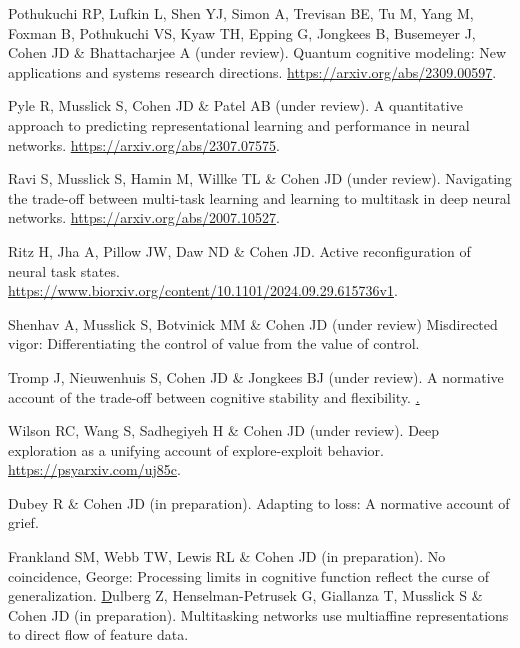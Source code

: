 \documentclass[10 pt]{article}
\begin{document}
Pothukuchi RP, Lufkin L, Shen YJ, Simon A, Trevisan BE, Tu M, Yang M, Foxman B, Pothukuchi VS, Kyaw TH, Epping G,
Jongkees B, Busemeyer J, Cohen JD \& Bhattacharjee A (under review). Quantum cognitive modeling: New applications and systems research directions. \href{https://arxiv.org/abs/2309.00597}{https://arxiv.org/abs/2309.00597}.

Pyle R, Musslick S, Cohen JD \& Patel AB (under review). A quantitative approach to predicting representational
learning and performance in neural networks. \href{https://arxiv.org/abs/2307.07575}{https://arxiv.org/abs/2307.07575}.

Ravi S, Musslick S, Hamin M, Willke TL \& Cohen JD (under review). Navigating the trade-off between multi-task
learning and learning to multitask in deep neural networks. \href{https://arxiv.org/abs/2007.10527}{https://arxiv.org/abs/2007.10527}.

Ritz H, Jha A, Pillow JW, Daw ND \& Cohen JD. Active reconfiguration of neural task states. \\ \href{
    https://www.biorxiv.org/content/10.1101/2024.09.29.615736v1}{https://www.biorxiv.org/content/10.1101/2024.09.29.615736v1}.

Shenhav A, Musslick S, Botvinick MM \& Cohen JD (under review) Misdirected vigor: Differentiating the control of value from the value of control.

Tromp J, Nieuwenhuis S, Cohen JD \& Jongkees BJ (under review). A normative account of the trade-off between
cognitive stability and flexibility. \href{//osf.io/preprints/psyarxiv/5rx9v_v1}.

Wilson RC, Wang S, Sadhegiyeh H \& Cohen JD (under review). Deep exploration as a unifying account of
explore-exploit behavior. \href{https://psyarxiv.com/uj85c}{https://psyarxiv.com/uj85c}.

Dubey R \& Cohen JD (in preparation). Adapting to loss: A normative account of grief.

Frankland SM, Webb TW, Lewis RL \& Cohen JD (in preparation). No coincidence, George: Processing limits in cognitive function reflect the curse of generalization. \href{https://www.researchgate.net/publication/389017061_No_Coincidence_George_Processing_Limits_in_Cognitive_Function_Reflect_the_Curse_of_Generalization}
\href{https://www.researchgate.net/pub/389017061}

Dulberg Z, Henselman-Petrusek G, Giallanza T, Musslick S \& Cohen JD (in preparation). Multitasking networks use multiaffine representations to direct flow of feature data.
\end{document}
